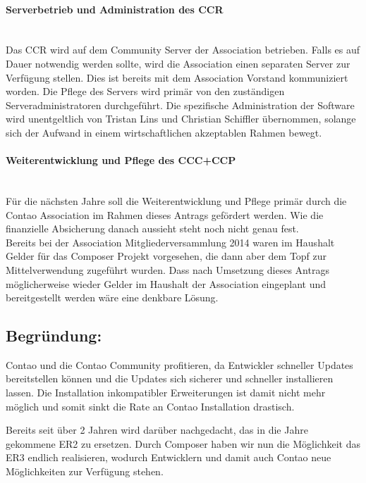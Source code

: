 \documentclass[
paper=a4,
draft=false,%
fontsize=10pt%
]{scrartcl}
\begin{document}
\paragraph{Serverbetrieb und Administration des CCR} ~\\
Das CCR wird auf dem Community Server der Association betrieben. Falls es auf Dauer notwendig werden sollte, wird die Association einen separaten Server zur Verfügung stellen. Dies ist bereits mit dem Association Vorstand kommuniziert worden.
Die Pflege des Servers wird primär von den zuständigen Serveradministratoren durchgeführt. Die spezifische Administration der Software wird unentgeltlich von Tristan Lins und Christian Schiffler übernommen, solange sich der Aufwand in einem wirtschaftlichen akzeptablen Rahmen bewegt.

\paragraph{Weiterentwicklung und Pflege des CCC+CCP} ~\\
Für die nächsten Jahre soll die Weiterentwicklung und Pflege primär durch die Contao Association im Rahmen dieses Antrags gefördert werden. Wie die finanzielle Absicherung danach aussieht steht noch nicht genau fest.\\
Bereits bei der Association Mitgliederversammlung 2014 waren im Haushalt Gelder für das Composer Projekt vorgesehen, die dann aber dem Topf zur Mittelverwendung zugeführt wurden. Dass nach Umsetzung dieses Antrags möglicherweise wieder Gelder im Haushalt der Association eingeplant und bereitgestellt werden wäre eine denkbare Lösung.

\subsection{Begründung: }

Contao und die Contao Community profitieren, da Entwickler schneller Updates bereitstellen können und die Updates sich sicherer und schneller installieren lassen. Die Installation inkompatibler Erweiterungen ist damit nicht mehr möglich und somit sinkt die Rate an  Contao Installation drastisch.

Bereits seit über 2 Jahren wird darüber nachgedacht, das in die Jahre gekommene ER2 zu ersetzen. Durch Composer haben wir nun die Möglichkeit das ER3 endlich realisieren, wodurch Entwicklern und damit auch Contao neue Möglichkeiten zur Verfügung stehen.
\end{document}
